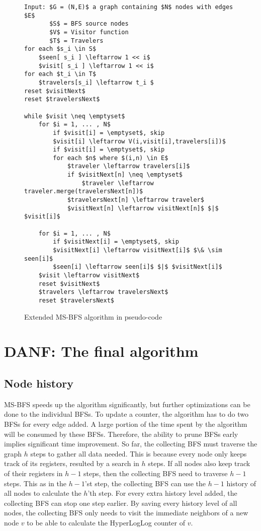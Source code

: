 \begin{figure}[h]
    \begin{lstlisting}[mathescape]
Input: $G = (N,E)$ a graph containing $N$ nodes with edges $E$
       $S$ = BFS source nodes
       $V$ = Visitor function
       $T$ = Travelers
for each $s_i \in S$
    $seen[ s_i ] \leftarrow 1 << i$
    $visit[ s_i ] \leftarrow 1 << i$
for each $t_i \in T$
    $travelers[s_i] \leftarrow t_i $
reset $visitNext$
reset $travelersNext$

while $visit \neq \emptyset$
    for $i = 1, ... , N$
        if $visit[i] = \emptyset$, skip
        $visit[i] \leftarrow V(i,visit[i],travelers[i])$
        if $visit[i] = \emptyset$, skip
        for each $n$ where $(i,n) \in E$
            $traveler \leftarrow travelers[i]$
            if $visitNext[n] \neq \emptyset$
                $traveler \leftarrow traveler.merge(travelersNext[n])$
            $travelersNext[n] \leftarrow traveler$
            $visitNext[n] \leftarrow visitNext[n]$ $|$ $visit[i]$

    for $i = 1, ... , N$
        if $visitNext[i] = \emptyset$, skip
        $visitNext[i] \leftarrow visitNext[i]$ $\& \sim seen[i]$
        $seen[i] \leftarrow seen[i]$ $|$ $visitNext[i]$
    $visit \leftarrow visitNext$
    reset $visitNext$
    $travelers \leftarrow travelersNext$
    reset $travelersNext$
    \end{lstlisting}
    \caption{Extended MS-BFS algorithm in pseudo-code}
    \label{fig:extended_ms-bfs_algorithm}
\end{figure}


\section{DANF: The final algorithm}
\subsection{Node history}

MS-BFS speeds up the algorithm significantly, but further optimizations can be done to the individual BFSs. To update a counter, the algorithm has to do two BFSs for every edge added. A large portion of the time spent by the algorithm will be consumed by these BFSs. Therefore, the ability to prune BFSs early implies significant time improvement. So far, the collecting BFS must traverse the graph $h$ steps to gather all data needed. This is because every node only keeps track of its registers, resulted by a search in $h$ steps. If all nodes also keep track of their registers in $h-1$ steps, then the collecting BFS need to traverse $h-1$ steps. This as in the $h-1$'st step, the collecting BFS can use the $h-1$ history of all nodes to calculate the $h$'th step. For every extra history level added, the collecting BFS can stop one step earlier. By saving every history level of all nodes, the collecting BFS only needs to visit the immediate neighbors of a new node $v$ to be able to calculate the HyperLogLog counter of $v$. 

